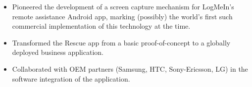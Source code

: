 \begin{minipage}{\linewidth}
\begin{itemize}
  \item Pioneered the development of a screen capture mechanism for LogMeIn's remote assistance Android app, marking (possibly) the world's first such commercial implementation of this technology at the time.
  \item Transformed the Rescue app from a basic proof-of-concept to a globally deployed business application.
  \item Collaborated with OEM partners (Samsung, HTC, Sony-Ericsson, LG) in the software integration of the application.
\end{itemize}
\end{minipage}
\divider
